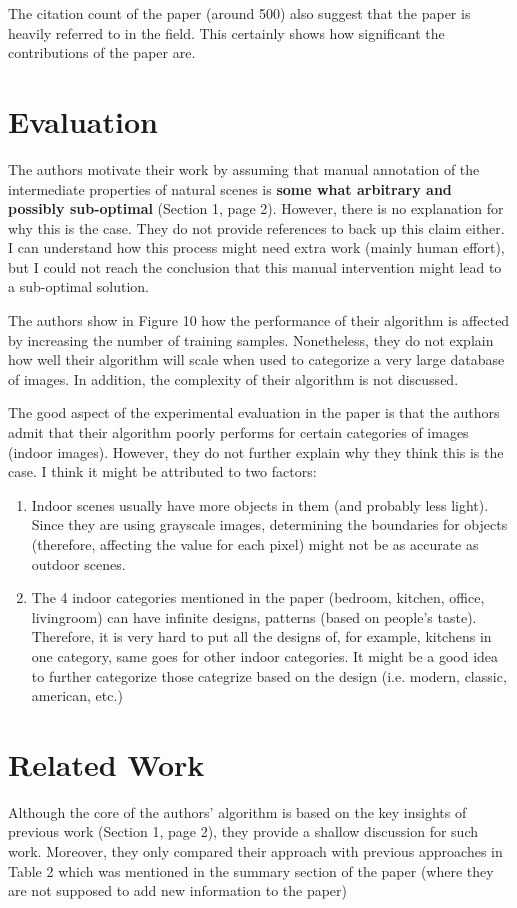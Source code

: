 \documentclass[11pt,a4paper]{article}
\begin{document}
The citation count of the paper (around 500) also suggest that the paper is heavily referred to in the field. This certainly shows how significant the
contributions of the paper are.

\section{Evaluation}
The authors motivate their work by assuming that manual annotation of the intermediate properties of natural scenes is \textbf{some what arbitrary and
possibly sub-optimal} (Section 1, page 2). However, there is no explanation for why this is the case. They do not provide references to back up this claim
either. I can understand how this process might need extra work (mainly human effort), but I could not reach the conclusion that this manual intervention might
lead to a sub-optimal solution.

The authors show in Figure 10 how the performance of their algorithm is affected by increasing the number of training samples. Nonetheless, they do not explain
how well their algorithm will scale when used to categorize a very large database of images. In addition, the complexity of their algorithm is not discussed.

The good aspect of the experimental evaluation in the paper is that the authors admit that their algorithm poorly performs for certain categories of images
(indoor images). However, they do not further explain why they think this is the case. I think it might be attributed to two factors:

\begin{enumerate}
 \item Indoor scenes usually have more objects in them (and probably less light). Since they are using grayscale images, determining the boundaries for
objects (therefore, affecting the value for each pixel) might not be as accurate as outdoor scenes.
 \item The 4 indoor categories mentioned in the paper (bedroom, kitchen, office, livingroom) can have infinite designs, patterns (based on people's taste).
Therefore, it is very hard to put all the designs of, for example, kitchens in one category, same goes for other indoor categories. It might be a good idea to
further categorize those categrize based on the design (i.e. modern, classic, american, etc.)
\end{enumerate}

\section{Related Work}
Although the core of the authors' algorithm is based on the key insights of previous work (Section 1, page 2), they provide a shallow discussion for such work.
Moreover, they only compared their approach with previous approaches in Table 2 which was mentioned in the summary section of the paper (where they are not
supposed to add new information to the paper)
\end{document}
